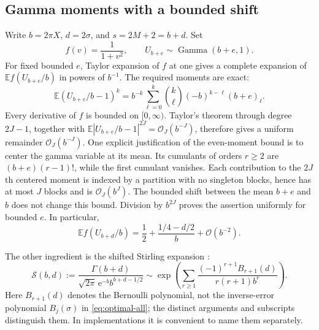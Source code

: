 \documentclass[11pt,a4paper]{article}
\theoremstyle{definition}
\numberwithin{equation}{section}
\newcommand{\ee}{\mathrm{e}}
\newcommand{\Oh}{\mathcal O}
\newcommand{\E}{\mathbb E}
\newcommand{\rising}[2]{(#1)_{#2}}
\begin{document}
\subsection{Gamma moments with a bounded shift}
Write $b=2\pi X$, $d=2\sigma$, and $s=2M+2=b+d$. Set
\begin{equation}
 f(v)=\frac1{1+v^2},\qquad U_{b+e}\sim\operatorname{Gamma}(b+e,1).
 \label{eq:gamma-notation}
\end{equation}
For fixed bounded $e$, Taylor expansion of $f$ at one gives a complete expansion of $\E f(U_{b+e}/b)$ in powers of $b^{-1}$. The required moments are exact:
\begin{equation}
 \E(U_{b+e}/b-1)^k
 =b^{-k}\sum_{\ell=0}^k\binom k\ell(-b)^{k-\ell}
                     \rising{b+e}{\ell}.
 \label{eq:moments}
\end{equation}
Every derivative of $f$ is bounded on $[0,\infty)$. Taylor's theorem through degree $2J-1$, together with
$\E|U_{b+e}/b-1|^{2J}=\Oh_J(b^{-J})$, therefore gives a uniform remainder $\Oh_J(b^{-J})$. One explicit justification of the even-moment bound is to center the gamma variable at its mean. Its cumulants of orders $r\ge2$ are $(b+e)(r-1)!$, while the first cumulant vanishes. Each contribution to the $2J$th centered moment is indexed by a partition with no singleton blocks, hence has at most $J$ blocks and is $\Oh_J(b^J)$. The bounded shift between the mean $b+e$ and $b$ does not change this bound. Division by $b^{2J}$ proves the assertion uniformly for bounded $e$. In particular,
\begin{equation}
 \E f(U_{b+d}/b)=\frac12+\frac{1/4-d/2}{b}+\Oh(b^{-2}).
 \label{eq:Ef-first}
\end{equation}

The other ingredient is the shifted Stirling expansion \cite[\S5.11]{dlmf}:
\begin{equation}
 \mathcal S(b,d):=
 \frac{\Gamma(b+d)}{\sqrt{2\pi}\,\ee^{-b}b^{b+d-1/2}}
 \sim\exp\left(\sum_{r\ge1}
   \frac{(-1)^{r+1}B_{r+1}(d)}{r(r+1)b^r}\right).
 \label{eq:shifted-Stirling}
\end{equation}
Here $B_{r+1}(d)$ denotes the Bernoulli polynomial, not the inverse-error polynomial $B_j(\sigma)$ in \eqref{eq:optimal-all}; the distinct arguments and subscripts distinguish them. In implementations it is convenient to name them separately.
\end{document}

